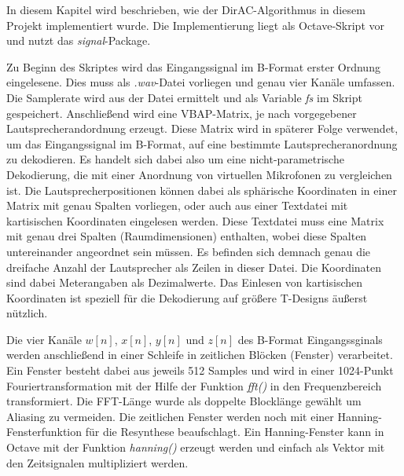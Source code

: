 In diesem Kapitel wird beschrieben, wie der DirAC-Algorithmus in diesem Projekt implementiert wurde. Die Implementierung liegt als Octave-Skript vor und nutzt das \textit{signal}-Package.

Zu Beginn des Skriptes wird das Eingangssignal im B-Format erster Ordnung eingelesene. Dies muss als \textit{.wav}-Datei vorliegen und genau vier Kanäle umfassen. Die Samplerate wird aus der Datei ermittelt und als Variable \textit{fs} im Skript gespeichert. Anschließend wird eine VBAP-Matrix, je nach vorgegebener Lautsprecherandordnung erzeugt. Diese Matrix wird in späterer Folge verwendet, um das Eingangssignal im B-Format, auf eine bestimmte Lautsprecheranordnung zu dekodieren. Es handelt sich dabei also um eine nicht-parametrische Dekodierung, die mit einer Anordnung von virtuellen Mikrofonen zu vergleichen ist. Die Lautsprecherpositionen können dabei als sphärische Koordinaten in einer Matrix mit genau Spalten vorliegen, oder auch aus einer Textdatei mit kartisischen Koordinaten eingelesen werden. Diese Textdatei muss eine Matrix mit genau drei Spalten (Raumdimensionen) enthalten, wobei diese Spalten untereinander angeordnet sein müssen. Es befinden sich demnach genau die dreifache Anzahl der Lautsprecher als Zeilen in dieser Datei. Die Koordinaten sind dabei Meterangaben als Dezimalwerte. Das Einlesen von kartisischen Koordinaten ist speziell für die Dekodierung auf größere T-Designs äußerst nützlich.

Die vier Kanäle $w[n]$, $x[n]$, $y[n]$ und $z[n]$ des B-Format Eingangssginals werden anschließend in einer Schleife in zeitlichen Blöcken (Fenster) verarbeitet. Ein Fenster besteht dabei aus jeweils 512 Samples und wird in einer 1024-Punkt Fouriertransformation mit der Hilfe der Funktion \textit{fft()} in den Frequenzbereich transformiert. Die FFT-Länge wurde als doppelte Blocklänge gewählt um Aliasing zu vermeiden. Die zeitlichen Fenster werden noch mit einer Hanning-Fensterfunktion für die Resynthese beaufschlagt. Ein Hanning-Fenster kann in Octave mit der Funktion \textit{hanning()} erzeugt werden und einfach als Vektor mit den Zeitsignalen multipliziert werden.